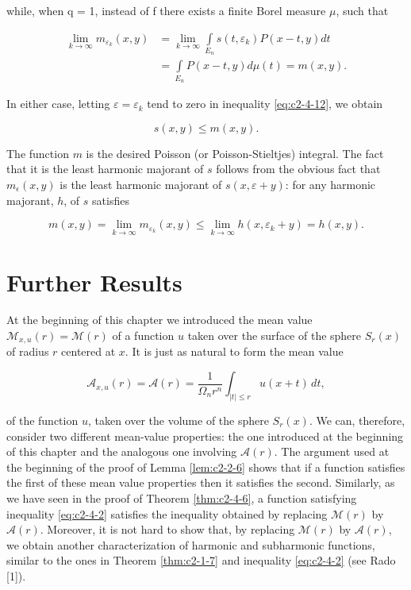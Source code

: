 while, when q = 1, instead of f there exists a finite Borel measure $\mu$, such that

\[
\begin{aligned}\lim_{k\to\infty}m_{\varepsilon_{k}}(x,y)&=\lim_{k\to\infty}\int\limits_{E_{n}}s(t,\varepsilon_{k})P(x-t,y)dt\\&=\int\limits_{E_{n}}P(x-t,y)d\mu(t)=m(x,y).\end{aligned}
\]

In either case, letting $\varepsilon = \varepsilon_{k}$ tend to zero in inequality \eqref{eq:c2-4-12}, we obtain

\[
s(x,y)\leq m(x,y).
\]

The function $m$ is the desired Poisson (or Poisson-Stieltjes) integral. The fact that it is the least harmonic majorant of $s$ follows from the obvious fact that $m_{\epsilon}(x,y)$ is the least harmonic majorant of $s(x,\varepsilon+y)$: for any harmonic majorant, $h$, of $s$ satisfies

\[
m(x,y)=\lim_{k\to\infty}m_{\varepsilon_{k}}(x,y)\leq\lim_{k\to\infty}h(x,\varepsilon_{k}+y)=h(x,y).
\]

\section{Further Results}

 At the beginning of this chapter we introduced the mean value $\mathcal{M}_{x,u}(r) = \mathcal{M}(r)$ of a function $u$ taken over the surface of the sphere $S_r(x)$ of radius $r$ centered at $x$. It is just as natural to form the mean value

\[
\mathcal{A}_{x,u}(r)=\mathcal{A}(r)=\frac{1}{\Omega_{n}r^{n}}\int_{|t|\leq r}u(x+t)\,dt,
\]

of the function $u$, taken over the volume of the sphere $S_r(x)$. We can, therefore, consider two different mean-value properties: the one introduced at the beginning of this chapter and the analogous one involving $\mathcal{A}(r)$. The argument used at the beginning of the proof of Lemma \ref{lem:c2-2-6} shows that if a function satisfies the first of these mean value properties then it satisfies the second. Similarly, as we have seen in the proof of Theorem \ref{thm:c2-4-6}, a function satisfying inequality \eqref{eq:c2-4-2} satisfies the inequality obtained by replacing $\mathcal{M}(r)$ by $\mathcal{A}(r)$. Moreover, it is not hard to show that, by replacing $\mathcal{M}(r)$ by $\mathcal{A}(r)$, we obtain another characterization of harmonic and subharmonic functions, similar to the ones in Theorem \ref{thm:c2-1-7} and inequality \eqref{eq:c2-4-2} (see Rado [1]).

